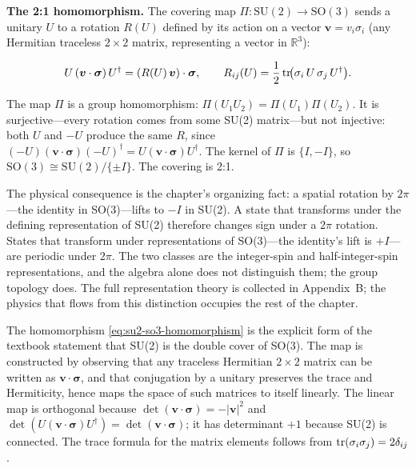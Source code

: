 \medskip\noindent\textbf{The 2:1 homomorphism.} The covering map $\Pi:\mathrm{SU}(2)\to\mathrm{SO}(3)$ sends a unitary $U$ to a rotation $R(U)$ defined by its action on a vector $\bm v = v_i\sigma_i$ (any Hermitian traceless $2\times2$ matrix, representing a vector in $\mathbb{R}^3$):
\begin{linenomath}
    \begin{equation}
        U\,(\bm v\cdot\bm\sigma)\,U^\dagger = (R(U)\,\bm v)\cdot\bm\sigma,
        \qquad
        R_{ij}(U) = \frac{1}{2}\,\mathrm{tr}\!\bigl(\sigma_i\,U\,\sigma_j\,U^\dagger\bigr).
        \label{eq:su2-so3-homomorphism}
    \end{equation}
\end{linenomath}
The map $\Pi$ is a group homomorphism: $\Pi(U_1U_2)=\Pi(U_1)\Pi(U_2)$. It is surjective---every rotation comes from some SU(2) matrix---but not injective: both $U$ and $-U$ produce the same $R$, since $(-U)(\bm v\cdot\bm\sigma)(-U)^\dagger = U(\bm v\cdot\bm\sigma)U^\dagger$. The kernel of $\Pi$ is $\{I,-I\}$, so $\mathrm{SO}(3) \cong \mathrm{SU}(2)/\{\pm I\}$. The covering is 2:1.

The physical consequence is the chapter's organizing fact: a spatial rotation by $2\pi$---the identity in SO(3)---lifts to $-I$ in SU(2). A state that transforms under the defining representation of SU(2) therefore changes sign under a $2\pi$ rotation. States that transform under representations of SO(3)---the identity's lift is $+I$---are periodic under $2\pi$. The two classes are the integer-spin and half-integer-spin representations, and the algebra alone does not distinguish them; the group topology does. The full representation theory is collected in Appendix~B; the physics that flows from this distinction occupies the rest of the chapter.

\begin{note}
    The homomorphism \eqref{eq:su2-so3-homomorphism} is the explicit form of the textbook statement that SU(2) is the double cover of SO(3). The map is constructed by observing that any traceless Hermitian $2\times2$ matrix can be written as $\bm v\cdot\bm\sigma$, and that conjugation by a unitary preserves the trace and Hermiticity, hence maps the space of such matrices to itself linearly. The linear map is orthogonal because $\det(\bm v\cdot\bm\sigma) = -|\bm v|^2$ and $\det(U(\bm v\cdot\bm\sigma)U^\dagger)=\det(\bm v\cdot\bm\sigma)$; it has determinant $+1$ because SU(2) is connected. The trace formula for the matrix elements follows from $\mathrm{tr}(\sigma_i\sigma_j)=2\delta_{ij}$.
\end{note}

